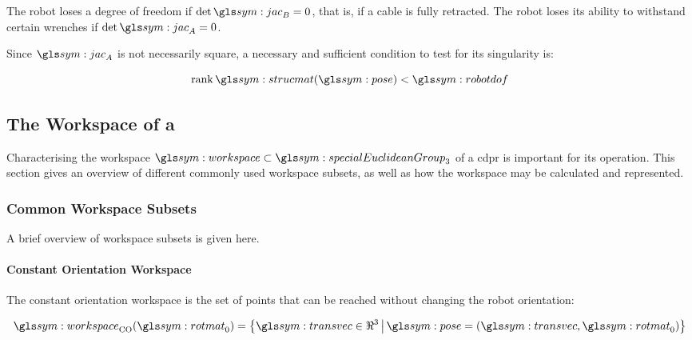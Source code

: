         The robot loses a degree of freedom if
        \(
            \det\jac_B = 0
		\), that is, if a cable is fully retracted.  The robot loses its ability
        to withstand certain wrenches if
        \(
            \det\jac_A = 0
        \).

		Since $\jac_A$ is not necessarily square,  a  necessary  and  sufficient
        condition to test for its singularity is:

        \begin{equation}
            \rank \strucmat(\pose) < \robotdof
			\label{eq:cond_singularity}
        \end{equation}

    \subsection{The Workspace of a }%
    \label{sec:the_workspace_of_a_cdpr}

        Characterising the workspace
		$\workspace\subset\specialEuclideanGroup{3}$   of	a	\gls{cdpr}	  is
        important for its operation. This section gives an overview of different
		commonly used workspace subsets, as well as how  the  workspace  may  be
        calculated and represented.

        \subsubsection{Common Workspace Subsets}%
        \label{sec:common_workspace_subsets}

			A	brief	overview   of	workspace	subsets   is   given   here.

            \paragraph{Constant Orientation Workspace}%
            \label{sec:constant_orientation_workspace}

				The constant orientation workspace is the set of points that can
				be	 reached   without	 changing	the    robot	orientation:

                \begin{equation}
                    \workspace_{\mathrm{CO}}(\rotmatbare_0) =
                        \left\{
                            \transvec\in\Re^3
                            \,\middle|\,
                            \pose = (\transvec, \rotmatbare_0)
                        \right\}
                \end{equation}

